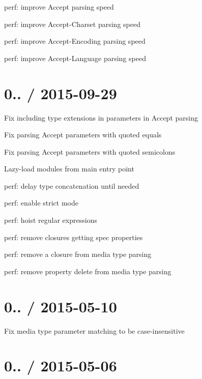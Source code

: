 
\begin{DoxyItemize}
\item perf\+: improve {\ttfamily Accept} parsing speed
\item perf\+: improve {\ttfamily Accept-\/\+Charset} parsing speed
\item perf\+: improve {\ttfamily Accept-\/\+Encoding} parsing speed
\item perf\+: improve {\ttfamily Accept-\/\+Language} parsing speed
\end{DoxyItemize}

\section*{0.. / 2015-\/09-\/29 }


\begin{DoxyItemize}
\item Fix including type extensions in parameters in {\ttfamily Accept} parsing
\item Fix parsing {\ttfamily Accept} parameters with quoted equals
\item Fix parsing {\ttfamily Accept} parameters with quoted semicolons
\item Lazy-\/load modules from main entry point
\item perf\+: delay type concatenation until needed
\item perf\+: enable strict mode
\item perf\+: hoist regular expressions
\item perf\+: remove closures getting spec properties
\item perf\+: remove a closure from media type parsing
\item perf\+: remove property delete from media type parsing
\end{DoxyItemize}

\section*{0.. / 2015-\/05-\/10 }


\begin{DoxyItemize}
\item Fix media type parameter matching to be case-\/insensitive
\end{DoxyItemize}

\section*{0.. / 2015-\/05-\/06 }


